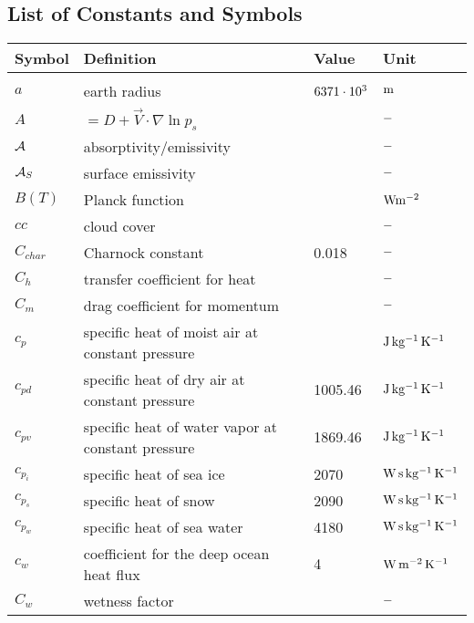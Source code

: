 \newcommand{\e}[1]{\cdot 10^{#1}}
\subsection{List of Constants and Symbols}
\label{locs}
\begin{tabular*}{\textwidth}{l@{\extracolsep\fill}lll}
Symbol         & Definition                       & Value   & Unit \\
\hline \\
$a$       & earth radius                          & $\rm 6371\e{3}$ & $\rm
m$ \\
$A$       & $=D+\vec{V} \cdot \nabla \ln p_s $         &         & $\rm -$ \\
${\cal A}$      &  absorptivity/emissivity                                           &                     & $\rm -$ \\
${\cal A}_S$  & surface emissivity                                              &         &$\rm -$ \\
$B(T)$            & Planck function                    &    &$\rm Wm^{-2}$ \\
$cc$      & cloud cover                 &    & $\rm -$\\
$C_{char}$     & Charnock constant                     & 0.018   & $\rm -$ \\
$C_h$          & transfer coefficient for heat         &         & $\rm -$ \\
$C_m$          & drag coefficient for momentum         &         & $\rm -$ \\
$c_p$          & specific heat of moist air at constant pressure      &         & $\rm J\,
kg^{-1}\, K^{-1}$ \\  
$c_{pd}$  & specific heat of dry air at constant pressure   & 1005.46      & $\rm J\,
kg^{-1}\, K^{-1}$ \\
$c_{pv}$  & specific heat of water vapor at constant pressure    & 1869.46      & $\rm J\,
kg^{-1}\, K^{-1}$ \\
$c_{p_i}$      & specific heat of sea ice              & 2070         & $\rm W\,
s\, kg^{-1}\, K^{-1}$ \\
$c_{p_s}$      & specific heat of snow            & 2090         & $\rm W\,
s\, kg^{-1}\, K^{-1}$ \\
$c_{p_w}$      & specific heat of sea water            & 4180         & $\rm W\,
s\, kg^{-1}\, K^{-1}$ \\
$c_w$          & coefficient for the deep ocean heat flux   & 4       & $\rm W\,
m^{-2}\, K^{-1}$ \\
$C_w$          & wetness factor                   &         & $\rm -$ \\


\end{tabular*}

